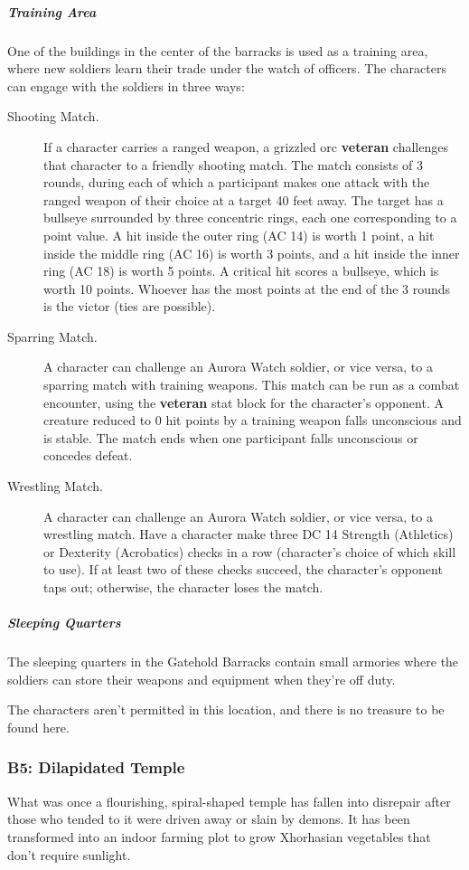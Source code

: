 \documentclass[10pt,a4paper,twoside,fancy,bg=print,twocolumn,openany,nodeprecatedcode]{dndbook}
\begin{document}
\subparagraph{Training Area}
One of the buildings in the center of the barracks is used as a training area, where new soldiers learn their trade under the watch of officers. The characters can engage with the soldiers in three ways:


\begin{description}
\item[Shooting Match.]
If a character carries a ranged weapon, a grizzled orc \textbf{veteran} challenges that character to a friendly shooting match. The match consists of 3 rounds, during each of which a participant makes one attack with the ranged weapon of their choice at a target 40 feet away. The target has a bullseye surrounded by three concentric rings, each one corresponding to a point value. A hit inside the outer ring (AC 14) is worth 1 point, a hit inside the middle ring (AC 16) is worth 3 points, and a hit inside the inner ring (AC 18) is worth 5 points. A critical hit scores a bullseye, which is worth 10 points. Whoever has the most points at the end of the 3 rounds is the victor (ties are possible).
\item[Sparring Match.]
A character can challenge an Aurora Watch soldier, or vice versa, to a sparring match with training weapons. This match can be run as a combat encounter, using the \textbf{veteran} stat block for the character's opponent. A creature reduced to 0 hit points by a training weapon falls unconscious and is stable. The match ends when one participant falls unconscious or concedes defeat.
\item[Wrestling Match.]
A character can challenge an Aurora Watch soldier, or vice versa, to a wrestling match. Have a character make three DC 14 Strength (Athletics) or Dexterity (Acrobatics) checks in a row (character's choice of which skill to use). If at least two of these checks succeed, the character's opponent taps out; otherwise, the character loses the match.
\end{description}

\subparagraph{Sleeping Quarters}
The sleeping quarters in the Gatehold Barracks contain small armories where the soldiers can store their weapons and equipment when they're off duty.

The characters aren't permitted in this location, and there is no treasure to be found here.

\subsubsection{B5: Dilapidated Temple}
What was once a flourishing, spiral-shaped temple has fallen into disrepair after those who tended to it were driven away or slain by demons. It has been transformed into an indoor farming plot to grow Xhorhasian vegetables that don't require sunlight.
\end{document}
